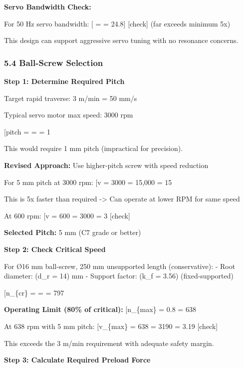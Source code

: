 \documentclass[
]{article}
\begin{document}
\textbf{Servo Bandwidth Check:}

For 50 Hz servo bandwidth: {[} =  =
24.8{]} {[}check{]} (far exceeds minimum 5x)

This design can support aggressive servo tuning with no resonance
concerns.

\subsubsection{5.4 Ball-Screw Selection}\label{ball-screw-selection}

\textbf{Step 1: Determine Required Pitch}

Target rapid traverse: 3 m/min = 50 mm/s

Typical servo motor max speed: 3000 rpm

{[}pitch =  =
 = 1 \text{ mm/rev}{]}

This would require 1 mm pitch (impractical for precision).

\textbf{Revised Approach:} Use higher-pitch screw with speed reduction

For 5 mm pitch at 3000 rpm: {[}v = 3000  = 15,000 
= 15 \text{ m/min}{]}

This is 5x faster than required -\textgreater{} Can operate at lower RPM
for same speed

At 600 rpm: {[}v = 600  = 3000  = 3
\text{ m/min}{]} {[}check{]}

\textbf{Selected Pitch:} 5 mm (C7 grade or better)

\textbf{Step 2: Check Critical Speed}

For Ø16 mm ball-screw, 250 mm unsupported length (conservative): - Root
diameter: (d\_r = 14) mm - Support factor: (k\_f = 3.56)
(fixed-supported)

{[}n\_\{cr\} =  =
 = 797 \text{ rpm}{]}

\textbf{Operating Limit (80\% of critical):} {[}n\_\{max\} = 0.8
 = 638 \text{ rpm}{]}

At 638 rpm with 5 mm pitch: {[}v\_\{max\} = 638  = 3190
 = 3.19 \text{ m/min}{]} {[}check{]}

This exceeds the 3 m/min requirement with adequate safety margin.

\textbf{Step 3: Calculate Required Preload Force}
\end{document}
